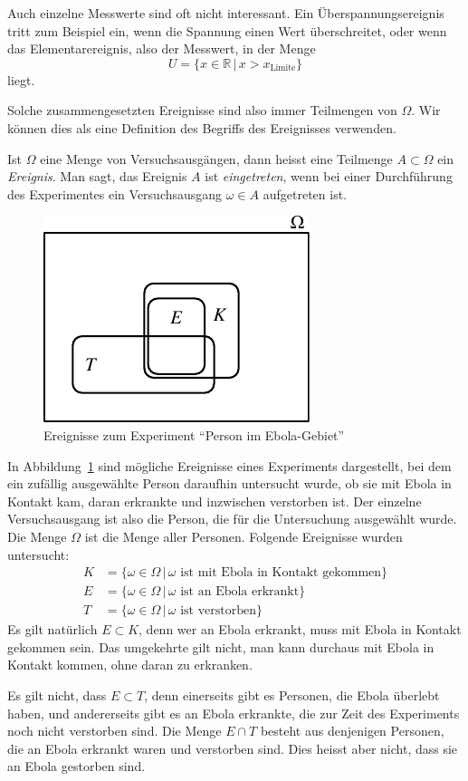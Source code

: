Auch einzelne Messwerte sind oft nicht interessant.
Ein Überspannungsereignis tritt zum Beispiel ein, wenn die Spannung
einen Wert überschreitet, oder wenn das Elementarereignis, also der Messwert,
in der Menge
\[
U=
\{x\in\mathbb R\,|\, x > x_{\text{Limite}}\}
\]
liegt.

Solche zusammengesetzten Ereignisse sind also immer Teilmengen von $\Omega$.
Wir können dies als eine Definition des Begriffs des Ereignisses
verwenden.

\begin{definition}
Ist $\Omega$ eine Menge von Versuchsausgängen, dann heisst eine Teilmenge
$A\subset\Omega$ ein {\em Ereignis}.
Man sagt, das Ereignis $A$ ist {\em eingetreten}, wenn bei einer Durchführung des
Experimentes ein Versuchsausgang $\omega\in A$ aufgetreten ist.
\end{definition}

\begin{beispiel}
\begin{figure}
\centering
\includegraphics{images/ebola-1.pdf}
\caption{Ereignisse zum Experiment ``Person im Ebola-Gebiet''
\label{image-ebola}}
\end{figure}

In Abbildung~\ref{image-ebola} sind mögliche Ereignisse eines Experiments
dargestellt, bei dem ein zufällig ausgewählte Person daraufhin untersucht
wurde, ob sie mit Ebola in Kontakt kam, daran erkrankte und inzwischen
verstorben ist.
Der einzelne Versuchsausgang ist also die Person, die für die
Untersuchung ausgewählt wurde.
Die Menge $\Omega$ ist die Menge aller Personen.
Folgende Ereignisse wurden untersucht:
\begin{align*}
K&=\{\omega\in\Omega\,|\,\text{$\omega$ ist mit Ebola in Kontakt gekommen}\}
\\
E&=\{\omega\in\Omega\,|\,\text{$\omega$ ist an Ebola erkrankt}\}
\\
T&=\{\omega\in\Omega\,|\,\text{$\omega$ ist verstorben}\}
\end{align*}
Es gilt natürlich $E\subset K$, denn wer an Ebola erkrankt, muss mit
Ebola in Kontakt gekommen sein.
Das umgekehrte gilt nicht, man kann durchaus mit Ebola in Kontakt
kommen, ohne daran zu erkranken.

Es gilt nicht, dass $E\subset T$, denn einerseits gibt es Personen, die
Ebola überlebt haben, und andererseits gibt es an Ebola erkrankte,
die zur Zeit des Experiments noch nicht verstorben sind.
Die Menge $E\cap T$ besteht aus denjenigen Personen, die an Ebola
erkrankt waren und verstorben sind.
Dies heisst aber nicht, dass sie an Ebola gestorben sind.
\end{beispiel}

